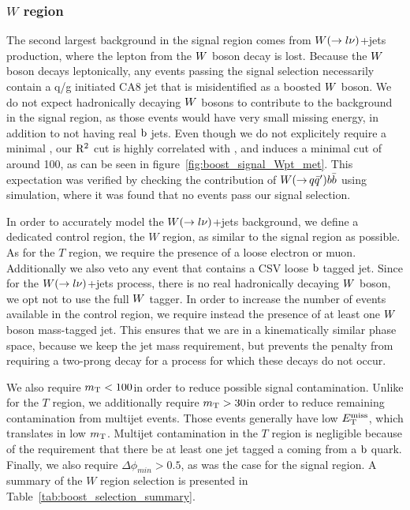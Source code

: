 

\subsubsection{\texorpdfstring{$W$}{W} region}

The second largest background in the signal region comes from $W(\rightarrow l\nu)$+jets
production, where the lepton from the $W$ boson decay is lost.
Because the $W$ boson decays leptonically, any events passing the signal selection necessarily
contain a q/g initiated CA8 jet that is misidentified as a boosted $W$ boson. 
We do not expect hadronically decaying $W$ bosons to contribute to the background in the signal
region, as those events would have very small missing energy, in addition to not having real
$\mathrm{b}$ jets. Even though we do not explicitely require a minimal \ETm, our $\mathrm{R^2}$ cut is highly
correlated with \ETm, and induces a minimal cut of around 100\GeV, as can be seen in
figure~\ref{fig:boost_signal_Wpt_met}. 
This expectation was verified by checking the contribution of $W({\rightarrow}\,
q\bar{q}')b\bar{b}$ using simulation, where it was found that no events pass our signal
selection. 

In order to accurately model the $W(\rightarrow l\nu)$+jets background, we define a dedicated
control region, the $W$ region, as similar to the signal region as possible. As for the $T$ region,
we require the presence of a loose electron or muon. Additionally we also veto any event that
contains a CSV loose $\mathrm{b}$ tagged jet.  
Since for the $W(\rightarrow l\nu)$+jets process, there is no real hadronically decaying $W$
boson, we opt not to use the full $W$ tagger. 
In order to increase the number of events available in the control region, we require instead the
presence of at least one $W$ boson mass-tagged jet. This ensures that we are in a kinematically
similar phase space, because we keep the jet mass requirement, but prevents the penalty from
requiring a two-prong decay for a process for which these decays do not occur. 

We also require $m_{\mathrm{T}} < 100$\GeV in order to reduce possible signal contamination. Unlike for the $T$
region, we additionally require $m_{\mathrm{T}} > 30$\GeV in order to reduce remaining contamination from
multijet events. Those events generally have low $E_{\mathrm{T}}^{\text{miss}}$, which translates in low $m_{\mathrm{T}}$. 
Multijet contamination in the $T$ region is negligible because of the
requirement that there be at least one jet tagged a coming from a $\mathrm{b}$ quark. 
Finally, we also require $\Delta\phi_{min} > 0.5$, as was the case for the signal region. 
A summary of the $W$ region selection is presented in Table~\ref{tab:boost_selection_summary}.

